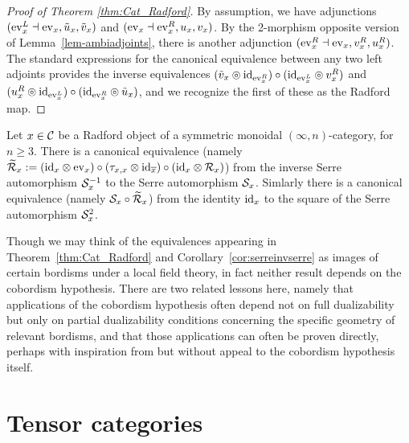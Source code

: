 \documentclass{amsart}
\begin{document}
\begin{proof}[Proof of Theorem \ref{thm:Cat_Radford}]
By assumption, we have adjunctions $(\mathrm{ev}_x^L \dashv \mathrm{ev}_x, \tilde{u}_x, \tilde{v}_x)$ and $(\mathrm{ev}_x \dashv \mathrm{ev}_x^R, u_x, v_x)$.  By the 2-morphism opposite version of Lemma~\ref{lem-ambiadjoints}, there is another adjunction $(\mathrm{ev}_x^R \dashv\mathrm{ev}_x,v_x^R,u_x^R)$.  The standard expressions for the canonical equivalence between any two left adjoints provides the inverse equivalences
$(\tilde{v}_x \circledcirc \mathrm{id}_{\mathrm{ev}_x^R})\circ (\mathrm{id}_{\mathrm{ev}_x^L} \circledcirc v_x^R)$
and
$(u_x^R \circledcirc \mathrm{id}_{\mathrm{ev}_x^L}) \circ (\mathrm{id}_{\mathrm{ev}_x^R} \circledcirc \tilde{u}_x)$, and we recognize the first of these as the Radford map.
\end{proof}

\begin{corollary}\label{cor:serreinvserre}
Let $x \in \mathcal C$ be a Radford object of a symmetric monoidal $(\infty,n)$-category, for $n \geq 3$.  There is a canonical equivalence (namely $\widetilde{\mathcal R}_x := (\mathrm{id}_{x} \otimes \mathrm{ev}_{x}) \circ (\tau_{x, x} \otimes \mathrm{id}_{\overline{x}}) \circ (\mathrm{id}_{x} \otimes \mathcal R_x)$) from the inverse Serre automorphism $\mathcal S_x^{-1}$ to the Serre automorphism $\mathcal S_x$.  Simlarly there is a canonical equivalence (namely $\mathcal S_x \circ \widetilde{\mathcal R}_x$) from the identity $\mathrm{id}_x$ to the square of the Serre automorphism $\mathcal S_x^2$.
\end{corollary}

Though we may think of the equivalences appearing in Theorem~\ref{thm:Cat_Radford} and Corollary~\ref{cor:serreinvserre} as images of certain bordisms under a local field theory, in fact neither result depends on the cobordism hypothesis.  There are two related lessons here, namely that applications of the cobordism hypothesis often depend not on full dualizability but only on partial dualizability conditions concerning the specific geometry of relevant bordisms, and that those applications can often be proven directly, perhaps with inspiration from but without appeal to the cobordism hypothesis itself.



\section{Tensor categories} \label{sec:tc}
\end{document}
